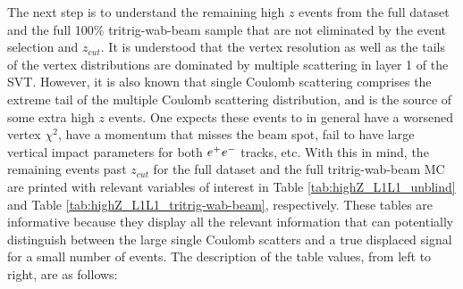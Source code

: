 The next step is to understand the remaining high $z$ events from the full dataset and the full 100\% tritrig-wab-beam sample that are not eliminated by the event selection and $z_{cut}$. It is understood that the vertex resolution as well as the tails of the vertex distributions are dominated by multiple scattering in layer 1 of the SVT. However, it is also known that single Coulomb scattering comprises the extreme tail of the multiple Coulomb scattering distribution, and is the source of some extra high $z$ events. %
One expects these events to in general have a worsened vertex $\chi^2$, have a momentum that misses the beam spot, fail to have large vertical impact parameters for both $e^{+}e^{-}$ tracks, etc. With this in mind, the remaining events past $z_{cut}$ for the full dataset and the full tritrig-wab-beam MC are printed with relevant variables of interest in Table \ref{tab:highZ_L1L1_unblind} and Table \ref{tab:highZ_L1L1_tritrig-wab-beam}, respectively. These tables are informative because they display all the relevant information that can potentially distinguish between the large single Coulomb scatters and a true displaced signal for a small number of events. %
The description of the table values, from left to right, are as follows:

